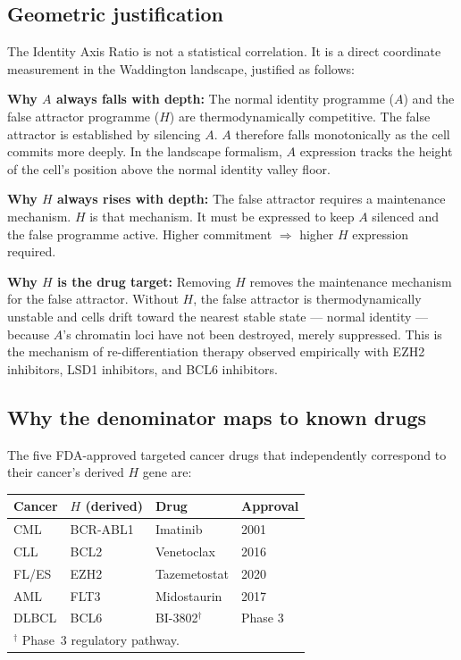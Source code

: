 \documentclass[11pt, a4paper]{article}
\begin{document}
\subsection{Geometric justification}

The Identity Axis Ratio is not a statistical correlation.
It is a direct coordinate measurement in the Waddington
landscape, justified as follows:

\textbf{Why $A$ always falls with depth:} The normal
identity programme ($A$) and the false attractor programme
($H$) are thermodynamically competitive. The false
attractor is established by silencing $A$. $A$ therefore
falls monotonically as the cell commits more deeply.
In the landscape formalism, $A$ expression tracks the
height of the cell's position above the normal identity
valley floor.

\textbf{Why $H$ always rises with depth:} The false
attractor requires a maintenance mechanism. $H$ is that
mechanism. It must be expressed to keep $A$ silenced
and the false programme active. Higher commitment
$\Rightarrow$ higher $H$ expression required.

\textbf{Why $H$ is the drug target:} Removing $H$
removes the maintenance mechanism for the false
attractor. Without $H$, the false attractor is
thermodynamically unstable and cells drift toward the
nearest stable state --- normal identity --- because
$A$'s chromatin loci have not been destroyed, merely
suppressed. This is the mechanism of re-differentiation
therapy observed empirically with EZH2 inhibitors,
LSD1 inhibitors, and BCL6 inhibitors.

\subsection{Why the denominator maps to known drugs}

The five FDA-approved targeted cancer drugs that
independently correspond to their cancer's derived $H$
gene are:

\begin{center}
\begin{tabular}{llll}
\toprule
Cancer & $H$ (derived) & Drug & Approval \\
\midrule
CML & BCR-ABL1 & Imatinib & 2001 \\
CLL & BCL2 & Venetoclax & 2016 \\
FL/ES & EZH2 & Tazemetostat & 2020 \\
AML & FLT3 & Midostaurin & 2017 \\
DLBCL & BCL6 & BI-3802$^\dagger$ & Phase 3 \\
\bottomrule
\multicolumn{4}{l}{\footnotesize $^\dagger$ Phase~3
  regulatory pathway.}
\end{tabular}
\end{center}
\end{document}
